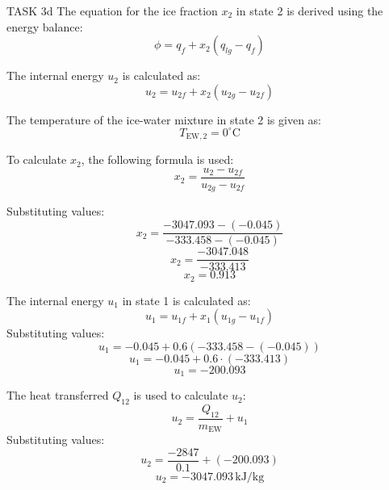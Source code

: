 TASK 3d  
The equation for the ice fraction \( x_2 \) in state 2 is derived using the energy balance:  
\[
\phi = q_f + x_2 \left( q_{lg} - q_f \right)
\]  

The internal energy \( u_2 \) is calculated as:  
\[
u_2 = u_{2f} + x_2 \left( u_{2g} - u_{2f} \right)
\]  

The temperature of the ice-water mixture in state 2 is given as:  
\[
T_{\text{EW},2} = 0^\circ\text{C}
\]  

To calculate \( x_2 \), the following formula is used:  
\[
x_2 = \frac{u_2 - u_{2f}}{u_{2g} - u_{2f}}
\]  

Substituting values:  
\[
x_2 = \frac{-3047.093 - (-0.045)}{-333.458 - (-0.045)}
\]  
\[
x_2 = \frac{-3047.048}{-333.413}
\]  
\[
x_2 = 0.913
\]  

The internal energy \( u_1 \) in state 1 is calculated as:  
\[
u_1 = u_{1f} + x_1 \left( u_{1g} - u_{1f} \right)
\]  
Substituting values:  
\[
u_1 = -0.045 + 0.6 \left( -333.458 - (-0.045) \right)
\]  
\[
u_1 = -0.045 + 0.6 \cdot (-333.413)
\]  
\[
u_1 = -200.093
\]  

The heat transferred \( Q_{12} \) is used to calculate \( u_2 \):  
\[
u_2 = \frac{Q_{12}}{m_{\text{EW}}} + u_1
\]  
Substituting values:  
\[
u_2 = \frac{-2847}{0.1} + (-200.093)
\]  
\[
u_2 = -3047.093 \, \text{kJ/kg}
\]